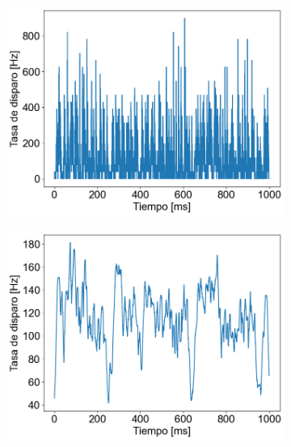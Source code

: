 \documentclass[aps,prb,twocolumn,superscriptaddress,floatfix,longbibliography]{revtex4-2}
\begin{document}
\begin{figure}
  \centering
  \begin{subfigure}[b]{0.3\textwidth}
      \centering
      \includegraphics[width=\textwidth]{tasa_de_disparo_2.png}
      \caption{\label{fig:tasa_de_disparo_2}}
  \end{subfigure}
  \hfill
  \begin{subfigure}[b]{0.3\textwidth}
      \centering
      \includegraphics[width=\textwidth]{tasa_de_disparo_300.png}
      \caption{\label{fig:tasa_de_disparo_300}}
  \end{subfigure}
  \hfill
  \begin{subfigure}[b]{0.3\textwidth}
      \centering

\end{subfigure}
\end{figure}
\end{document}
